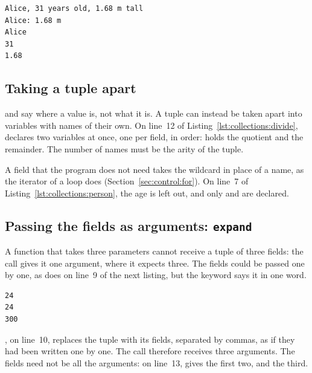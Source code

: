 
\vspace{-10pt}%
\begin{lstlisting}[style=bashVerb]
Alice, 31 years old, 1.68 m tall
Alice: 1.68 m
Alice
31
1.68
\end{lstlisting}

\subsection{Taking a tuple apart}

 and  say where a value is, not what it is. A
tuple can instead be taken apart into variables with names of their own. On
line~12 of Listing~\ref{lst:collections:divide},
 declares two variables at once, one per
field, in order:  holds the quotient and  the remainder. The
number of names must be the arity of the tuple.

A field that the program does not need takes the wildcard \token{\_} in place of
a name, as the iterator of a loop does (Section~\ref{sec:control:for}). On
line~7 of Listing~\ref{lst:collections:person}, the age is left out, and only
 and  are declared.

\subsection{Passing the fields as arguments: \texttt{expand}}
\label{sec:collections:expand}

A function that takes three parameters cannot receive a tuple of three fields:
the call gives it one argument, where it expects three. The fields could be
passed one by one, as  does on line~9 of
the next listing, but the keyword  says it in one word.


\vspace{-10pt}%
\begin{lstlisting}[style=bashVerb]
24
24
300
\end{lstlisting}

, on line~10, replaces the tuple with its fields, separated by
commas, as if they had been written one by one. The call therefore receives
three arguments. The fields need not be all the arguments: on line~13,
 gives the first two, and  the third.

